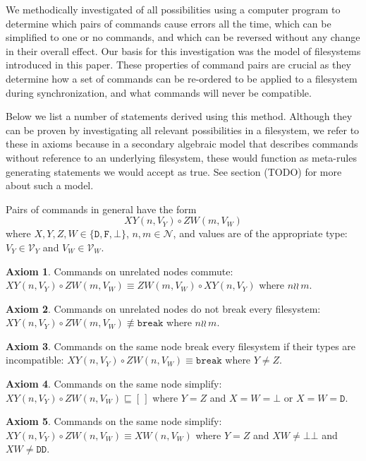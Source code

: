 \documentclass[12pt]{article}
\newcommand{\setvx}[1]{\mathcal{V}_{#1}}
\newcommand{\setn}{\mathcal{N}} %
\newcommand{\empt}{\bot}
\newcommand{\cbrk}{\mathtt{break}}
\newcommand{\fscommand}[2]{{#1#2}}
\newcommand{\fsregcommandchar}[1]{\mathtt{#1}}
\newcommand{\fsregcommand}[2]{\fscommand{\fsregcommandchar{#1}}{\fsregcommandchar{#2}}}
\newcommand{\cbb}{\fsregcommand{\empt}{\empt}}
\newcommand{\cdd}{\fsregcommand{D}{D}}
\newcommand{\cxy}{\fscommand{X}{Y}}
\newcommand{\cxw}{\fscommand{X}{W}}
\newcommand{\czw}{\fscommand{Z}{W}}
\newcommand{\typeset}{\{\fsregcommandchar{D},\fsregcommandchar{F},\empt\}} %
\newcommand{\cc}{\circ} %
\newcommand{\eqext}{\sqsubseteq}
\newcommand{\nequiv}{\not\equiv}
\newcommand{\indep}{\wr\!\!\wr\,} %
\newcommand{\unrel}{\indep} %
\newcommand{\emptyseq}{[\,]} %
\theoremstyle{definition}
\newtheorem{myax}{Axiom}
\begin{document}
We methodically investigated of all possibilities using a computer program
to determine
which pairs of commands cause errors all the time,
which can be simplified to one or no commands, and which can be reversed
without any change in their overall effect.
Our basis for this investigation was the model of filesystems introduced in this paper.
These properties of command pairs are crucial as they determine
how a set of commands can be re-ordered to be applied to a filesystem
during synchronization, and what commands will never be compatible.

Below we list a number of statements derived using this method.
Although they can be proven by investigating all relevant possibilities
in a filesystem, we refer to these in axioms because in a secondary algebraic model
that describes commands without reference to an underlying filesystem,
these would function as meta-rules generating statements we would accept as true.
See section (TODO) for more about such a model.

\medskip

Pairs of commands in general have the form
\[ \cxy(n,V_Y)\cc  \czw(m,V_W) \]
where $X,Y,Z,W\in\typeset$, $n,m\in\setn$, 
and values are of the appropriate type: 
$V_Y\in\setvx{Y}$ and $V_W\in\setvx{W}$.

\begin{myax}\label{ax_separate_commute}
Commands on unrelated nodes commute:
$\cxy(n,V_Y)\cc  \czw(m,V_W) \equiv \czw(m,V_W)\cc \cxy(n,V_Y)$ where $n\unrel m$.
\end{myax}

\begin{myax}\label{ax_separate_nobreaks}
Commands on unrelated nodes do not break every filesystem:
$\cxy(n,V_Y)\cc  \czw(m,V_W) \nequiv \cbrk$ where $n\unrel m$.
\end{myax}

\begin{myax}\label{ax_same_breaks}
Commands on the same node break every filesystem if their types are incompatible:
$\cxy(n,V_Y)\cc \czw(n,V_W) \equiv \cbrk$ where $Y\ne Z$.
\end{myax}

\begin{myax}\label{ax_same_emptyseq}
Commands on the same node simplify:
$\cxy(n,V_Y)\cc \czw(n,V_W) \eqext \emptyseq$ where $Y=Z$ and $X=W=\fsregcommandchar{\empt}$ or $X=W=\fsregcommandchar{D}$.
\end{myax}

\begin{myax}\label{ax_same_singlec}
Commands on the same node simplify:
$\cxy(n,V_Y)\cc  \czw(n,V_W) \equiv \cxw(n,V_W)$ where $Y=Z$ and $XW\neq\cbb$ and $XW\neq\cdd$.
\end{myax}
\end{document}
